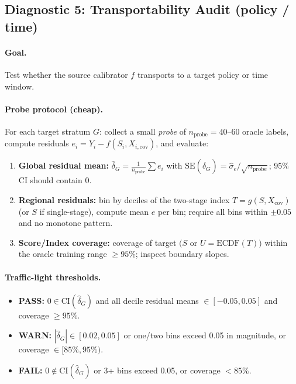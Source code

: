 \subsection{Diagnostic 5: Transportability Audit (policy / time)}
\label{diag:transport}

\paragraph{Goal.} Test whether the source calibrator $f$ transports to a target policy or time window.

\paragraph{Probe protocol (cheap).} For each target stratum $G$:
collect a small \emph{probe} of $n_{\text{probe}}=40\text{--}60$ oracle labels,
compute residuals $e_i = Y_i - f(S_i,X_{i,\mathrm{cov}})$, and evaluate:

\begin{enumerate}
\item \textbf{Global residual mean:}
$\hat\delta_G = \frac{1}{n_{\text{probe}}}\sum e_i$ with
$\mathrm{SE}(\hat\delta_G) = \hat\sigma_e/\sqrt{n_{\text{probe}}}$;
95\% CI should contain $0$.
\item \textbf{Regional residuals:}
bin by deciles of the two-stage index $T=g(S,X_{\mathrm{cov}})$ (or $S$ if single-stage), compute mean $e$ per bin; require all bins within $\pm 0.05$ and no monotone pattern.
\item \textbf{Score/Index coverage:}
coverage of target $(S$ or $U=\mathrm{ECDF}(T))$ within the oracle training range $\ge 95\%$; inspect boundary slopes.
\end{enumerate}

\paragraph{Traffic-light thresholds.}
\begin{itemize}
\item \textbf{PASS:} $0 \in \text{CI}(\hat\delta_G)$ and all decile residual means $\in [-0.05,0.05]$ and coverage $\ge 95\%$.
\item \textbf{WARN:} $|\hat\delta_G| \in [0.02,0.05]$ or one/two bins exceed 0.05 in magnitude, or coverage $\in [85\%,95\%)$.
\item \textbf{FAIL:} $0 \notin \text{CI}(\hat\delta_G)$ or 3+ bins exceed 0.05, or coverage $<85\%$.
\end{itemize}

